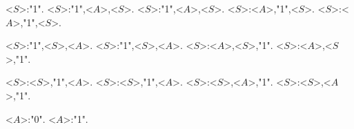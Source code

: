 <$S$>:"1".
<$S$>:"1",<$A$>,<$S$>.
<$S$>:"1",<$A$>,<$S$>.
<$S$>:<$A$>,"1",<$S$>.
<$S$>:<$A$>,"1",<$S$>.

<$S$>:"1",<$S$>,<$A$>.
<$S$>:"1",<$S$>,<$A$>.
<$S$>:<$A$>,<$S$>,"1".
<$S$>:<$A$>,<$S$>,"1".

<$S$>:<$S$>,"1",<$A$>.
<$S$>:<$S$>,"1",<$A$>.
<$S$>:<$S$>,<$A$>,"1".
<$S$>:<$S$>,<$A$>,"1".


<$A$>:"0".
<$A$>:"1".